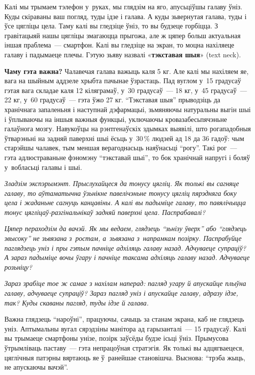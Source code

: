 Калі мы трымаем тэлефон у~руках, мы глядзім на яго, апусьціўшы галаву ўніз. Куды скіраваны ваш погляд, туды ідзе і галава. А куды зьвернутая галава, туды і ўсе цягліцы цела. Таму калі вы гледзіце ўніз, то вы будзеце горбіцца. З гравітацыяй нашы цягліцы змагаюцца прыгожа, але ж цяпер больш актуальная іншая праблема~--- смартфон. Калі вы гледзіце на экран, то моцна нахіляеце галаву і падымаеце плечы. Гэтую зьяву назвалі «\textbf{тэкставая шыя}» (text neck).

\textbf{Чаму гэта важна?} Чалавечая галава важыць каля 5 кг. Але калі мы нахіляем яе, вага на шыйным аддзеле хрыбта пачынае ўзрастаць. Пад вуглом у~15 градусаў гэтая вага складае каля 12 кіляграмаў, у~30 градусаў~--- 18 кг, у~45 градусаў~--- 22 кг, у~60 градусаў~--- гэта ўжо 27 кг. ``Тэкставая шыя'' прыводзіць да хранічнага запаленьня і наступнай дэфармацыі, зьмяняючы натуральны выгін шыі і ўплываючы на іншыя важныя функцыі, уключаючы кровазабесьпячэньне галаўнога мозгу. Навукоўцы на рэнтгенаўскіх здымках выявілі, што рогападобныя ўтварэньні на задняй паверхні шыі ёсьць у~30\,\% людзей ад 18 да 36 гадоў: чым старэйшы чалавек, тым меншая верагоднасьць наяўнасьці ``рогу''. Такі рог~--- гэта адлюстраваньне фэномэну ``тэкставай шыі'', то бок хранічнай напругі і боляў у~вобласьці галавы і шыі.

\emph{Зладзім экспэрымэнт. Прыслухайцеся да тонусу цягліц. Як толькі вы сагняце галаву, то аўтаматычна ўзьнікне павелічэньне тонусу цягліц пярэдняга боку цела і жаданьне сагнуць канцавіны. А калі вы падыміце галаву, то павялічыцца тонус цягліцаў-разгінальнікаў задняй паверхні цела. Паспрабавалі?}

\emph{Цяпер пераходзім да вачэй. Як мы ведаем, глядзець ``зьнізу ўверх'' або ``глядзець звысоку'' не зьвязана з~ростам, а~зьвязана з~напрамкам позірку. Паспрабуйце паглядзець уніз і пры гэтым пачніце адхіляць галаву назад. Адчуваеце супраціў? А зараз падыміце вочы ўгару і пачніце таксама адхіляць галаву назад. Адчуваеце розьніцу?}

\emph{Зараз зрабіце тое ж самае з нахілам наперад: пагляд угару й апускайце плыўна галаву, адчуваеце супраціў? Зараз пагляд уніз і апускайце галаву, адразу ідзе, так? Куды скаваны пагляд, туды ідзе й галава.}

Важна глядзець ``нароўні'', працуючы, сачыць за станам экрана, каб не глядзець уніз. Аптымальны вугал сярэдзіны манітора ад гарызанталі~--- 15 градусаў. Калі вы трымаеце смартфоны унізе, позірк заўсёды будзе ісьці ўніз. Прымусова ўтрымліваць паставу~--- гэта непрацоўная стратэгія. Як толькі вы адцягваецеся, цяглічныя патэрны вяртаюць яе ў~ранейшае становішча. Выснова: ``трэба жыць, не апускаючы вачэй''.

